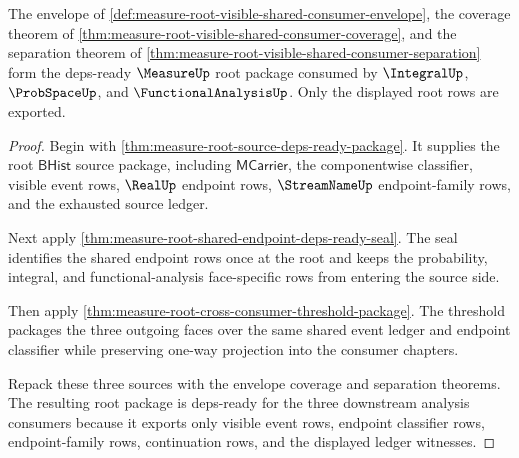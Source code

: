 \begin{theorem}
\label{thm:measure-root-visible-shared-consumer-deps-ready}
The envelope of
\autoref{def:measure-root-visible-shared-consumer-envelope}, the coverage
theorem of \autoref{thm:measure-root-visible-shared-consumer-coverage}, and
the separation theorem of
\autoref{thm:measure-root-visible-shared-consumer-separation} form the
deps-ready $\MeasureUp$ root package consumed by $\IntegralUp$, $\ProbSpaceUp$,
and $\FunctionalAnalysisUp$. Only the displayed root rows are exported.
\end{theorem}
\begin{proof}
Begin with \autoref{thm:measure-root-source-deps-ready-package}. It supplies
the root $\mathsf{BHist}$ source package, including $\mathsf{MCarrier}$, the
componentwise classifier, visible event rows, $\RealUp$ endpoint rows,
$\StreamNameUp$ endpoint-family rows, and the exhausted source ledger.

Next apply \autoref{thm:measure-root-shared-endpoint-deps-ready-seal}. The
seal identifies the shared endpoint rows once at the root and keeps the
probability, integral, and functional-analysis face-specific rows from
entering the source side.

Then apply \autoref{thm:measure-root-cross-consumer-threshold-package}. The
threshold packages the three outgoing faces over the same shared event ledger
and endpoint classifier while preserving one-way projection into the consumer
chapters.

Repack these three sources with the envelope coverage and separation theorems.
The resulting root package is deps-ready for the three downstream analysis
consumers because it exports only visible event rows, endpoint classifier rows,
endpoint-family rows, continuation rows, and the displayed ledger witnesses.
\end{proof}
